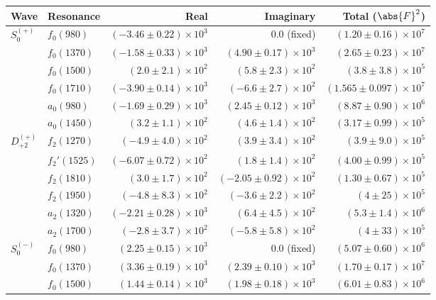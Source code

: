\begin{table}[ht]
    \begin{center}
        \begin{tabular}{llrrr}\toprule
        Wave & Resonance & Real & Imaginary & Total ($\abs{F}^2$) \\\midrule
$S_{0}^{(+)}$ & $f_{0}(980)$ & $(-3.46 \pm 0.22) \times 10^{3}$ & $0.0$ (fixed) & $(1.20 \pm 0.16) \times 10^{7}$ \\
 & $f_{0}(1370)$ & $(-1.58 \pm 0.33) \times 10^{3}$ & $(4.90 \pm 0.17) \times 10^{3}$ & $(2.65 \pm 0.23) \times 10^{7}$ \\
 & $f_{0}(1500)$ & $(2.0 \pm 2.1) \times 10^{2}$ & $(5.8 \pm 2.3) \times 10^{2}$ & $(3.8 \pm 3.8) \times 10^{5}$ \\
 & $f_{0}(1710)$ & $(-3.90 \pm 0.14) \times 10^{3}$ & $(-6.6 \pm 2.7) \times 10^{2}$ & $(1.565 \pm 0.097) \times 10^{7}$ \\
 & $a_{0}(980)$ & $(-1.69 \pm 0.29) \times 10^{3}$ & $(2.45 \pm 0.12) \times 10^{3}$ & $(8.87 \pm 0.90) \times 10^{6}$ \\
 & $a_{0}(1450)$ & $(3.2 \pm 1.1) \times 10^{2}$ & $(4.6 \pm 1.4) \times 10^{2}$ & $(3.17 \pm 0.99) \times 10^{5}$ \\
$D_{+2}^{(+)}$ & $f_{2}(1270)$ & $(-4.9 \pm 4.0) \times 10^{2}$ & $(3.9 \pm 3.4) \times 10^{2}$ & $(3.9 \pm 9.0) \times 10^{5}$ \\
 & $f_{2}'(1525)$ & $(-6.07 \pm 0.72) \times 10^{2}$ & $(1.8 \pm 1.4) \times 10^{2}$ & $(4.00 \pm 0.99) \times 10^{5}$ \\
 & $f_{2}(1810)$ & $(3.0 \pm 1.7) \times 10^{2}$ & $(-2.05 \pm 0.92) \times 10^{2}$ & $(1.30 \pm 0.67) \times 10^{5}$ \\
 & $f_{2}(1950)$ & $(-4.8 \pm 8.3) \times 10^{2}$ & $(-3.6 \pm 2.2) \times 10^{2}$ & $(4 \pm 25) \times 10^{5}$ \\
 & $a_{2}(1320)$ & $(-2.21 \pm 0.28) \times 10^{3}$ & $(6.4 \pm 4.5) \times 10^{2}$ & $(5.3 \pm 1.4) \times 10^{6}$ \\
 & $a_{2}(1700)$ & $(-2.8 \pm 3.7) \times 10^{2}$ & $(-5.8 \pm 5.8) \times 10^{2}$ & $(4 \pm 33) \times 10^{5}$ \\
$S_{0}^{(-)}$ & $f_{0}(980)$ & $(2.25 \pm 0.15) \times 10^{3}$ & $0.0$ (fixed) & $(5.07 \pm 0.60) \times 10^{6}$ \\
 & $f_{0}(1370)$ & $(3.36 \pm 0.19) \times 10^{3}$ & $(2.39 \pm 0.10) \times 10^{3}$ & $(1.70 \pm 0.17) \times 10^{7}$ \\
 & $f_{0}(1500)$ & $(1.44 \pm 0.14) \times 10^{3}$ & $(1.98 \pm 0.18) \times 10^{3}$ & $(6.01 \pm 0.83) \times 10^{6}$ \\

\end{tabular}
\end{center}
\end{table}
